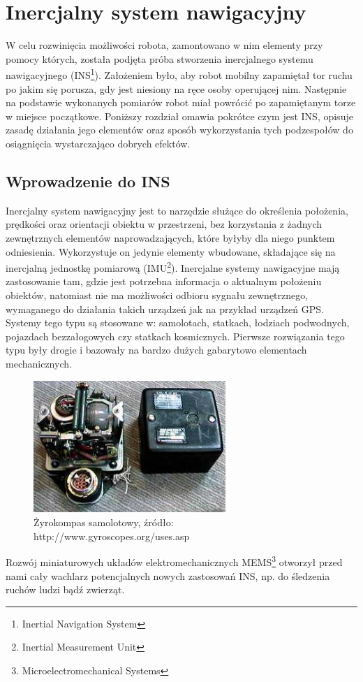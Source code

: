 \section{Inercjalny system nawigacyjny}
W celu rozwinięcia możliwości robota, zamontowano w nim elementy przy pomocy
których, została podjęta próba stworzenia inercjalnego systemu nawigacyjnego
(INS\footnote{Inertial Navigation System}). Założeniem było, aby robot mobilny
zapamiętał tor ruchu po jakim się porusza, gdy jest niesiony na ręce
osoby operującej nim. Następnie na podstawie wykonanych pomiarów robot miał
powrócić po zapamiętanym torze w miejsce początkowe. Poniższy rozdział omawia
pokrótce czym jest INS, opisuje zasadę działania jego elementów oraz sposób
wykorzystania tych podzespołów do osiągnięcia wystarczająco dobrych efektów.

\subsection{Wprowadzenie do INS}

Inercjalny system nawigacyjny jest to narzędzie służące do określenia położenia,
prędkości oraz orientacji obiektu w przestrzeni, bez korzystania z żadnych
zewnętrznych elementów naprowadzających, które byłyby dla niego punktem
odniesienia. Wykorzystuje on jedynie elementy wbudowane, składające się na
inercjalną jednostkę pomiarową (IMU\footnote{Inertial Measurement Unit}).
Inercjalne systemy nawigacyjne mają zastosowanie tam, gdzie jest potrzebna
informacja o aktualnym położeniu obiektów, natomiast nie ma możliwości odbioru
sygnału zewnętrznego, wymaganego do działania takich urządzeń jak na przykład urządzeń GPS. 
Systemy tego typu są stosowane w: samolotach, statkach, łodziach podwodnych, pojazdach
bezzałogowych czy statkach kosmicznych. Pierwsze rozwiązania tego typu były drogie i bazowały na bardzo
dużych gabarytowo elementach mechanicznych. 
\begin{figure}[h!]
 \centering
 \includegraphics[height=50mm]{../images/ch04/gyrocompass.jpg}
 \caption{Żyrokompas samolotowy, źródło: http://www.gyroscopes.org/uses.asp}
 \label{fig:Zyrokompas}
\end{figure}
Rozwój miniaturowych układów elektromechanicznych MEMS\footnote{Microelectromechanical Systems} otworzył przed nami cały
wachlarz potencjalnych nowych zastosowań INS, np. do śledzenia ruchów ludzi bądź
zwierząt.


